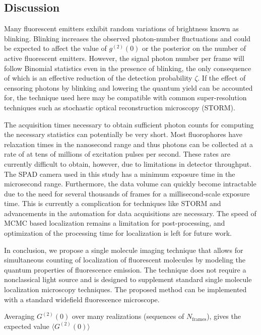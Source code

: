 \documentclass[a4paper, twocolumn, superscriptaddress,prl]{revtex4}  %
\begin{document}
\subsection{Discussion}

Many fluorescent emitters exhibit random variations of brightness known as blinking. Blinking increases the observed photon-number fluctuations and could be expected to affect the value of $g^{(2)}(0)$ or the posterior on the number of active fluorescent emitters. However, the signal photon number per frame will follow Binomial statistics even in the presence of blinking, the only consequence of which is an effective reduction of the detection probability $\zeta$. If the effect of censoring photons by blinking and lowering the quantum yield can be accounted for, the technique used here may be compatible with common super-resolution techniques such as stochastic optical reconstruction microscopy (STORM). 

The acquisition times necessary to obtain sufficient photon counts for computing the necessary statistics can potentially be very short. Most fluorophores have relaxation times in the nanosecond range and thus photons can be collected at a rate of at tens of millions of excitation pulses per second. These rates are currently difficult to obtain, however, due to limitations in detector throughput. The SPAD camera used in this study has a minimum exposure time in the microsecond range. Furthermore, the data volume can quickly become intractable due to the need for several thousands of frames for a millisecond-scale exposure time. This is currently a complication for techniques like STORM and advancements in the automation for data acquisitions are necessary. The speed of MCMC based localization remains a limitation for post-processing, and optimization of the processing time for localization is left for future work. 

In conclusion, we propose a single molecule imaging technique that allows for simultaneous counting of localization of fluorescent molecules by modeling the quantum properties of fluorescence emission. The technique does not require a nonclassical light source and is designed to supplement standard single molecule localization microscopy techniques. The proposed method can be implemented with a standard widefield fluorescence microscope.

Averaging $G^{(2)}(0)$ over many realizations (sequences of $N_{\mathrm{frames}}$), gives the expected value $\langle G^{(2)}(0)\rangle $
\end{document}
